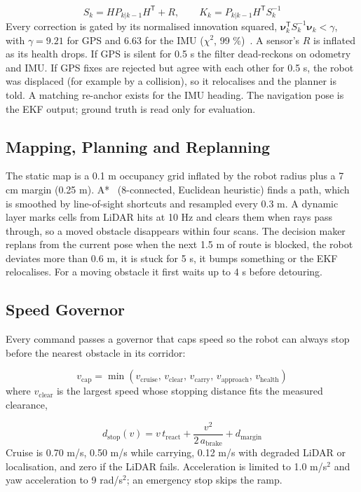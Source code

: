\documentclass[conference]{IEEEtran}
\begin{document}
\begin{equation}
S_k = H P_{k|k-1} H^{\mathsf T} + R, \qquad K_k = P_{k|k-1} H^{\mathsf T} S_k^{-1}
\label{eq:gain}
\end{equation}
Every correction is gated by its normalised innovation squared, $\boldsymbol{\nu}_k^{\mathsf T} S_k^{-1} \boldsymbol{\nu}_k < \gamma$, with $\gamma = 9.21$ for GPS and 6.63 for the IMU ($\chi^2$, 99 \%)~\cite{r7}. A sensor's $R$ is inflated as its health drops. If GPS is silent for 0.5 s the filter dead-reckons on odometry and IMU. If GPS fixes are rejected but agree with each other for 0.5 s, the robot was displaced (for example by a collision), so it relocalises and the planner is told. A matching re-anchor exists for the IMU heading. The navigation pose is the EKF output; ground truth is read only for evaluation.

\subsection{Mapping, Planning and Replanning}
The static map is a 0.1 m occupancy grid inflated by the robot radius plus a 7 cm margin (0.25 m). A*~\cite{r3} (8-connected, Euclidean heuristic) finds a path, which is smoothed by line-of-sight shortcuts and resampled every 0.3 m. A dynamic layer marks cells from LiDAR hits at 10 Hz and clears them when rays pass through, so a moved obstacle disappears within four scans. The decision maker replans from the current pose when the next 1.5 m of route is blocked, the robot deviates more than 0.6 m, it is stuck for 5 s, it bumps something or the EKF relocalises. For a moving obstacle it first waits up to 4 s before detouring.

\subsection{Speed Governor}
Every command passes a governor that caps speed so the robot can always stop before the nearest obstacle in its corridor:

\begin{equation}
v_{\mathrm{cap}} = \min\left(v_{\mathrm{cruise}},\, v_{\mathrm{clear}},\, v_{\mathrm{carry}},\, v_{\mathrm{approach}},\, v_{\mathrm{health}}\right)
\label{eq:vcap}
\end{equation}
where $v_{\mathrm{clear}}$ is the largest speed whose stopping distance fits the measured clearance,

\begin{equation}
d_{\mathrm{stop}}(v) = v\, t_{\mathrm{react}} + \frac{v^{2}}{2\, a_{\mathrm{brake}}} + d_{\mathrm{margin}}
\label{eq:dstop}
\end{equation}
Cruise is 0.70 m/s, 0.50 m/s while carrying, 0.12 m/s with degraded LiDAR or localisation, and zero if the LiDAR fails. Acceleration is limited to 1.0 m/s$^2$ and yaw acceleration to 9 rad/s$^2$; an emergency stop skips the ramp.
\end{document}
